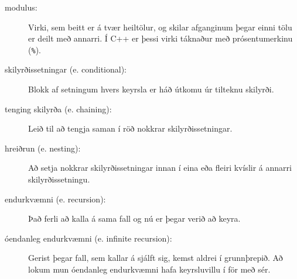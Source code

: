 \begin{description}

\item[modulus:]  Virki, sem beitt er á tvær heiltölur, og skilar afganginum þegar einni tölu er deilt með annarri.
Í C++ er þessi virki táknaður með prósentumerkinu ({\tt \%}).

\item[skilyrðissetningar (e. conditional):]  Blokk af setningum hvers keyrsla er háð útkomu úr tilteknu skilyrði.

\item[tenging skilyrða (e. chaining):]  Leið til að tengja saman í röð nokkrar skilyrðissetningar.

\item[hreiðrun (e. nesting):] Að setja nokkrar skilyrðissetningar innan í eina eða fleiri kvíslir á annarri skilyrðissetningu.

\item[endurkvæmni (e. recursion):]  Það ferli að kalla á sama fall og nú er þegar verið að keyra.

\item[óendanleg endurkvæmni (e. infinite recursion):]  Gerist þegar fall, sem kallar á sjálft sig, kemst aldrei í grunnþrepið.
Að lokum mun óendanleg endurkvæmni hafa keyrsluvillu í för með sér.


\end{description}
